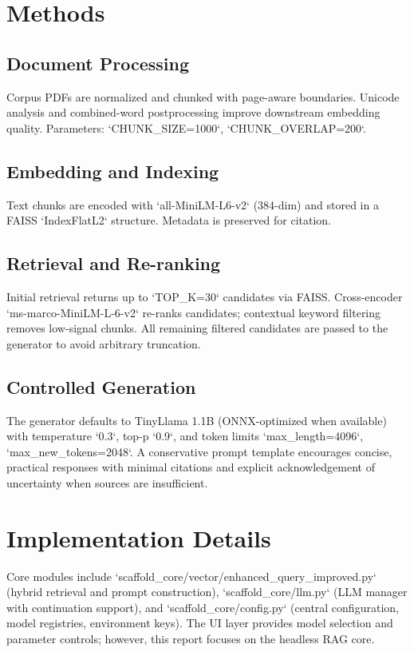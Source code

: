 \documentclass[11pt]{article}
\begin{document}
\section{Methods}
\subsection{Document Processing}
Corpus PDFs are normalized and chunked with page-aware boundaries. Unicode analysis and combined-word postprocessing improve downstream embedding quality. Parameters: `CHUNK\_SIZE=1000`, `CHUNK\_OVERLAP=200`.

\subsection{Embedding and Indexing}
Text chunks are encoded with `all-MiniLM-L6-v2` (384-dim) and stored in a FAISS `IndexFlatL2` structure. Metadata is preserved for citation.

\subsection{Retrieval and Re-ranking}
Initial retrieval returns up to `TOP\_K=30` candidates via FAISS. Cross-encoder `ms-marco-MiniLM-L-6-v2` re-ranks candidates; contextual keyword filtering removes low-signal chunks. All remaining filtered candidates are passed to the generator to avoid arbitrary truncation.

\subsection{Controlled Generation}
The generator defaults to TinyLlama 1.1B (ONNX-optimized when available) with temperature `0.3`, top-p `0.9`, and token limits `max\_length=4096`, `max\_new\_tokens=2048`. A conservative prompt template encourages concise, practical responses with minimal citations and explicit acknowledgement of uncertainty when sources are insufficient.

\section{Implementation Details}
Core modules include `scaffold\_core/vector/enhanced\_query\_improved.py` (hybrid retrieval and prompt construction), `scaffold\_core/llm.py` (LLM manager with continuation support), and `scaffold\_core/config.py` (central configuration, model registries, environment keys). The UI layer provides model selection and parameter controls; however, this report focuses on the headless RAG core.
\end{document}
